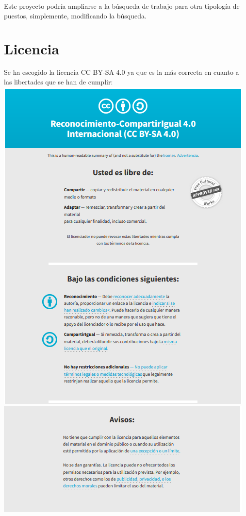 \documentclass[IB]{PlantillaPACnova_Est}
\begin{document}
Este proyecto podría ampliarse a la búsqueda de trabajo para otra tipología de puestos, simplemente, modificando la búsqueda.

\newpage 
\section{Licencia}
Se ha escogido la licencia CC BY-SA 4.0 ya que es la más correcta en cuanto a las libertades que se han de cumplir:
\\
\includegraphics [scale=0.75]{licencia1.png}
\\
\includegraphics [scale=0.75]{licencia2.png}
\end{document}
